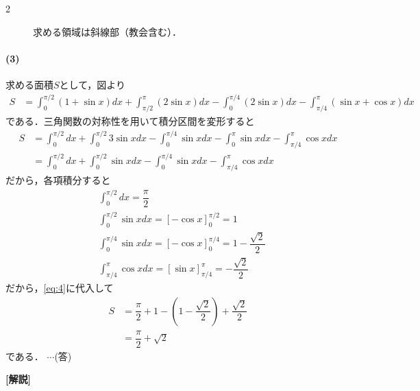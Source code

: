 \documentclass[../../main.tex]{subfiles}
\begin{document}
\begin{multicols}{2}
\begin{figure}[H]
    \caption{求める領域は斜線部（教会含む）．}
    \label{1998-2:fig:2}
  \end{figure}

  \paragraph{(3)}
  求める面積$S$として，図より
  \begin{align}
    S
    & = \int_0^{\pi/2} (1+\sin x)dx + \int_{\pi/2}^\pi (2\sin x)dx - \int_0^{\pi/4} (2\sin x)dx - \int_{\pi/4}^\pi (\sin x + \cos x)dx
  \end{align}
  である．三角関数の対称性を用いて積分区間を変形すると
  \begin{align}
    S
    & = \int_0^{\pi/2} dx + \int_0^{\pi/2} 3\sin x dx - \int_0^{\pi/4} \sin x dx -  \int_{0}^\pi \sin x dx   - \int_{\pi/4}^\pi \cos x dx \\
    & = \int_0^{\pi/2} dx + \int_0^{\pi/2} \sin x dx - \int_0^{\pi/4} \sin x dx - \int_{\pi/4}^\pi \cos x dx   \label{eq:4}
  \end{align}
  だから，各項積分すると
  \begin{align}
    & \int_0^{\pi/2} dx = \dfrac{\pi}{2}                                                      \\
    & \int_{0}^{\pi/2} \sin x dx = \left[-\cos x\right]_{0}^{\pi/2} = 1                      \\
    & \int_{0}^{\pi/4} \sin x dx = \left[-\cos x\right]_{0}^{\pi/4} = 1-\dfrac{\sqrt{2}}{2}   \\
    & \int_{\pi/4}^{\pi} \cos x dx = \left[\sin x\right]_{\pi/4}^{\pi} = -\dfrac{\sqrt{2}}{2}
  \end{align}
  だから，\cref{eq:4}に代入して
  \begin{align}
    S
    & = \dfrac{\pi}{2} + 1 - \left(1-\dfrac{\sqrt{2}}{2}\right) +\dfrac{\sqrt{2}}{2} \\
    & =\dfrac{\pi}{2} + \sqrt{2}
  \end{align}
  である．  $\cdots$(答)

  {\bf [解説]}

  \newpage
\end{multicols}
\end{document}
